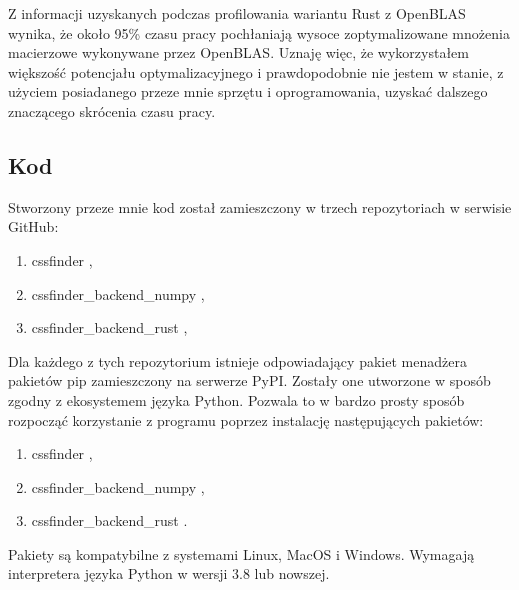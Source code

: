 \documentclass[11pt, a4paper]{article}
\begin{document}
\begin{sloppypar}
    Z informacji uzyskanych podczas profilowania wariantu Rust z OpenBLAS wynika, że około
    95\% czasu pracy pochłaniają wysoce zoptymalizowane mnożenia macierzowe wykonywane
    przez OpenBLAS. Uznaję więc, że wykorzystałem większość potencjału optymalizacyjnego
    i prawdopodobnie nie jestem w stanie, z użyciem posiadanego przeze mnie sprzętu i oprogramowania,
    uzyskać dalszego znaczącego skrócenia czasu pracy.

    \subsection{Kod}
    Stworzony przeze mnie kod został zamieszczony w trzech repozytoriach w serwisie
    GitHub:
    \begin{enumerate}
      \item cssfinder \cite{CSSFinder_New},

      \item cssfinder\_backend\_numpy \cite{CSSFinder_New_Numpy},

      \item cssfinder\_backend\_rust \cite{CSSFinder_New_Rust},
    \end{enumerate}

    Dla każdego z tych repozytorium istnieje odpowiadający pakiet menadżera pakietów pip
    \cite{PIP} zamieszczony na serwerze PyPI. Zostały one utworzone w sposób zgodny z ekosystemem
    języka Python. Pozwala to w bardzo prosty sposób rozpocząć korzystanie z programu
    poprzez instalację następujących pakietów:
    \begin{enumerate}
      \item cssfinder \cite{CSSFinder_New_PyPI},

      \item cssfinder\_backend\_numpy \cite{CSSFinder_New_Numpy_PyPI},

      \item cssfinder\_backend\_rust \cite{CSSFinder_New_Rust_PyPI}.
    \end{enumerate}

    Pakiety są kompatybilne z systemami Linux, MacOS i Windows. Wymagają interpretera
    języka Python w wersji 3.8 lub nowszej.
  \end{sloppypar}
  \newpage


  \begin{sloppypar}
    \medskip
    \printbibliography
    [heading=bibintoc, title={Odwołania}]
  \end{sloppypar}
\end{document}

